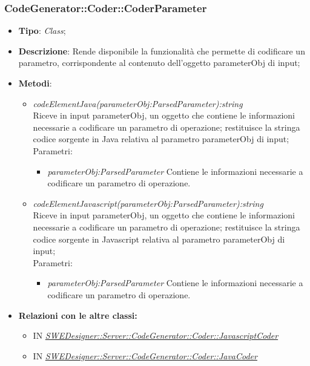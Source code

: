 \documentclass[../DefinizioneDiProdotto.tex]{subfiles}
\begin{document}
			
			
			\subsubsection{CodeGenerator::Coder::CoderParameter}
			\hypertarget{SWEDesigner::Server::CodeGenerator::Coder::CoderParameter}{}
			\begin{itemize}
				\item \textbf{Tipo}: \emph{Class};
				\item \textbf{Descrizione}: Rende disponibile la funzionalità che permette di codificare un parametro, corrispondente al contenuto dell'oggetto parameterObj di input;\\
				\item \textbf{Metodi}:
				\begin{itemize}
					\item \emph{codeElementJava(parameterObj:ParsedParameter):string} \\ 
					Riceve in input parameterObj, un oggetto che contiene le informazioni necessarie a codificare un parametro di operazione; 
					restituisce la stringa codice sorgente in Java relativa al parametro parameterObj di input; \\
					Parametri:
					\begin{itemize}
						\item \emph{parameterObj:ParsedParameter} Contiene le informazioni necessarie a codificare un parametro di operazione.
					\end{itemize}
					
					
					
					\item \emph{codeElementJavascript(parameterObj:ParsedParameter):string} \\ 
					Riceve in input parameterObj, un oggetto che contiene le informazioni necessarie a codificare un parametro di operazione; 
					restituisce la stringa codice sorgente in Javascript relativa al parametro parameterObj di input; \\
					Parametri:
					\begin{itemize}
						\item \emph{parameterObj:ParsedParameter} Contiene le informazioni necessarie a codificare un parametro di operazione.
					\end{itemize}
				\end{itemize}
				
				\item \textbf{Relazioni con le altre classi:}
				\begin{itemize}
					\item IN \hyperlink{SWEDesigner::Server::CodeGenerator::Coder::JavascriptCoder}{\emph{SWEDesigner::Server::CodeGenerator::Coder::JavascriptCoder}}
					\item IN \hyperlink{SWEDesigner::Server::CodeGenerator::Coder::JavaCoder}{\emph{SWEDesigner::Server::CodeGenerator::Coder::JavaCoder}}
				\end{itemize}	
			\end{itemize}
			
\end{document}
